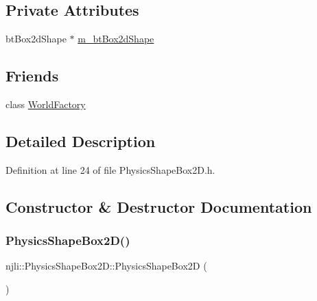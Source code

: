 \subsection*{Private Attributes}
\begin{DoxyCompactItemize}
\item 
bt\+Box2d\+Shape $\ast$ \mbox{\hyperlink{classnjli_1_1_physics_shape_box2_d_a3e946790bb7d72f91faf88224d88ca72}{m\+\_\+bt\+Box2d\+Shape}}
\end{DoxyCompactItemize}
\subsection*{Friends}
\begin{DoxyCompactItemize}
\item 
class \mbox{\hyperlink{classnjli_1_1_physics_shape_box2_d_acb96ebb09abe8f2a37a915a842babfac}{World\+Factory}}
\end{DoxyCompactItemize}


\subsection{Detailed Description}


Definition at line 24 of file Physics\+Shape\+Box2\+D.\+h.



\subsection{Constructor \& Destructor Documentation}
\mbox{\label{classnjli_1_1_physics_shape_box2_d_a10a881d6e9951bd920eb1ebc53dbe2c7}} 
\subsubsection{\texorpdfstring{Physics\+Shape\+Box2\+D()}{PhysicsShapeBox2D()}\hspace{0.1cm}{\footnotesize\ttfamily [1/3]}}
{\footnotesize\ttfamily njli\+::\+Physics\+Shape\+Box2\+D\+::\+Physics\+Shape\+Box2D (\begin{DoxyParamCaption}{ }\end{DoxyParamCaption})\hspace{0.3cm}{\ttfamily [protected]}}

